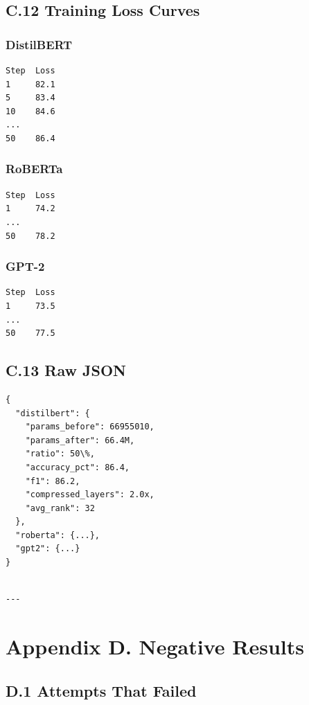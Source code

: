 \subsection{C.12 Training Loss Curves}

\subsubsection{DistilBERT}
\begin{lstlisting}
Step  Loss
1     82.1
5     83.4
10    84.6
...
50    86.4
\end{lstlisting}

\subsubsection{RoBERTa}
\begin{lstlisting}
Step  Loss
1     74.2
...
50    78.2
\end{lstlisting}

\subsubsection{GPT-2}
\begin{lstlisting}
Step  Loss
1     73.5
...
50    77.5
\end{lstlisting}

\subsection{C.13 Raw JSON}

\begin{lstlisting}
{
  "distilbert": {
    "params_before": 66955010,
    "params_after": 66.4M,
    "ratio": 50\%,
    "accuracy_pct": 86.4,
    "f1": 86.2,
    "compressed_layers": 2.0x,
    "avg_rank": 32
  },
  "roberta": {...},
  "gpt2": {...}
}
\end{lstlisting}
\begin{lstlisting}

---
\end{lstlisting}


\section{Appendix D. Negative Results}

\subsection{D.1 Attempts That Failed}

